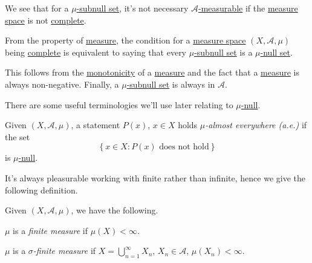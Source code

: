 \begin{note}
	We see that for a \hyperref[def:mu-subnull-set]{\(\mu\)-subnull set}, it's not necessary \hyperref[def:measurable-set]{\(\mathcal{A}\)-measurable}
	if the \hyperref[def:measure-space]{measure space} is not \hyperref[def:complete-measure-space]{complete}.
\end{note}
\begin{remark}
	From the property of \hyperref[def:measure]{measure}, the condition for a \hyperref[def:measure-space]{measure space} \((X, \mathcal{A} , \mu )\)
	being \hyperref[def:complete]{complete} is equivalent to saying that every \hyperref[def:mu-subnull-set]{\(\mu \)-subnull set} is a \hyperref[def:mu-null-set]{\(\mu\)-null set}.
\end{remark}
\begin{explanation}
	This follows from the \hyperref[thm:measure-space-monotonicity]{monotonicity} of a \hyperref[def:measure]{measure} and the fact that a \hyperref[def:measure]{measure} is always
	non-negative. Finally, a \hyperref[def:mu-subnull-set]{\(\mu \)-subnull set} is always in \(\mathcal{A} \).
\end{explanation}

There are some useful terminologies we'll use later relating to \hyperref[def:mu-null-set]{\(\mu\)-null}.
\begin{definition}\label{def:mu-almost-everywhere}
	Given \((X, \mathcal{A} , \mu)\), a statement \(P(x)\), \(x\in X\) holds \emph{\(\mu\)-almost everywhere (a.e.)} if
	the set
	\[
		\left\{x\in X\colon P(x) \text{ does not hold} \right\}
	\]
	is \hyperref[def:mu-null-set]{\(\mu\)-null}.
\end{definition}

It's always pleasurable working with finite rather than infinite, hence we give the following definition.
\begin{definition*}
	Given \((X, \mathcal{A} , \mu)\), we have the following.
	\begin{definition}\label{def:finite-measure}
		\(\mu\) is a \emph{finite measure} if \(\mu(X)<\infty \).
	\end{definition}

	\begin{definition}\label{def:sigma-finite-measure}
		\(\mu\) is a \emph{\(\sigma\)-finite measure} if \(X = \bigcup_{n=1}^{\infty} X_{n}\),
		\(X_{n}\in \mathcal{A} \), \(\mu(X_{n})<\infty \).
	\end{definition}

\end{definition*}

